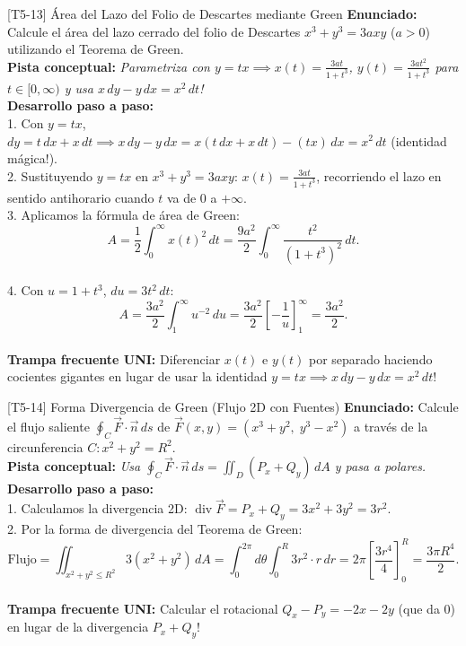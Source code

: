 \documentclass[11pt,a4paper]{article}
\begin{document}
\begin{ejerciciobox}{[T5-13] Área del Lazo del Folio de Descartes mediante Green}
\textbf{Enunciado:} Calcule el área del lazo cerrado del folio de Descartes $x^3 + y^3 = 3axy$ ($a > 0$) utilizando el Teorema de Green.\\[0.2cm]
\textbf{Pista conceptual:} \emph{Parametriza con $y = tx \implies x(t) = \frac{3at}{1+t^3}$, $y(t) = \frac{3at^2}{1+t^3}$ para $t \in [0, \infty)$ y usa $x\,dy - y\,dx = x^2\,dt$!}\\[0.2cm]
\textbf{Desarrollo paso a paso:}\\
1. Con $y = t x$, $dy = t\,dx + x\,dt \implies x\,dy - y\,dx = x(t\,dx + x\,dt) - (tx)\,dx = x^2\,dt$ (identidad mágica!).\\
2. Sustituyendo $y = tx$ en $x^3 + y^3 = 3axy$: $x(t) = \frac{3at}{1+t^3}$, recorriendo el lazo en sentido antihorario cuando $t$ va de $0$ a $+\infty$.\\
3. Aplicamos la fórmula de área de Green:\\
$$A = \frac{1}{2}\int_0^\infty x(t)^2\,dt = \frac{9a^2}{2}\int_0^\infty \frac{t^2}{(1+t^3)^2}\,dt.$$\\
4. Con $u = 1 + t^3$, $du = 3t^2\,dt$:\\
$$A = \frac{3a^2}{2}\int_1^\infty u^{-2}\,du = \frac{3a^2}{2}\left[-\frac{1}{u}\right]_1^\infty = \frac{3a^2}{2}.$$\\[0.2cm]
\textbf{Trampa frecuente UNI:} Diferenciar $x(t)$ e $y(t)$ por separado haciendo cocientes gigantes en lugar de usar la identidad $y=tx \implies x\,dy - y\,dx = x^2\,dt$!
\end{ejerciciobox}

\begin{ejerciciobox}{[T5-14] Forma Divergencia de Green (Flujo 2D con Fuentes)}
\textbf{Enunciado:} Calcule el flujo saliente $\oint_C \vec{F}\cdot\vec{n}\,ds$ de $\vec{F}(x,y) = (x^3 + y^2,\; y^3 - x^2)$ a través de la circunferencia $C: x^2 + y^2 = R^2$.\\[0.2cm]
\textbf{Pista conceptual:} \emph{Usa $\oint_C \vec{F}\cdot\vec{n}\,ds = \iint_D (P_x + Q_y)\,dA$ y pasa a polares.}\\[0.2cm]
\textbf{Desarrollo paso a paso:}\\
1. Calculamos la divergencia 2D: $\operatorname{div}\vec{F} = P_x + Q_y = 3x^2 + 3y^2 = 3r^2$.\\
2. Por la forma de divergencia del Teorema de Green:\\
$$\text{Flujo} = \iint_{x^2+y^2\le R^2} 3(x^2+y^2)\,dA = \int_0^{2\pi} d\theta \int_0^R 3r^2\cdot r\,dr = 2\pi\left[\frac{3r^4}{4}\right]_0^R = \frac{3\pi R^4}{2}.$$\\[0.2cm]
\textbf{Trampa frecuente UNI:} Calcular el rotacional $Q_x - P_y = -2x - 2y$ (que da $0$) en lugar de la divergencia $P_x + Q_y$!
\end{ejerciciobox}
\end{document}
